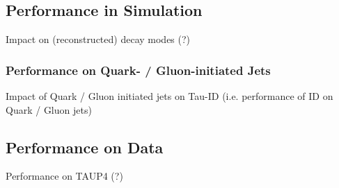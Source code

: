 \subsection{Performance in Simulation}
\label{sec:bdt_perf_sim}

Impact on (reconstructed) decay modes (?)

\subsubsection{Performance on Quark- / Gluon-initiated Jets}
\label{sec:bdt_perf_quark_gluon}

Impact of Quark / Gluon initiated jets on Tau-ID (i.e. performance of ID
on Quark / Gluon jets)

\subsection{Performance on Data}
\label{sec:bdt_perf_data}

Performance on TAUP4 (?)

